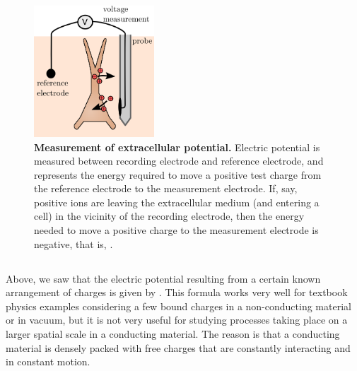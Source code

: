 \begin{figure}[!ht]
\begin{center}
\includegraphics[width=0.4\textwidth]{Figures/Basics/rec_elec_circuit.png}
\end{center}
\caption[]{\textbf{Measurement of extracellular potential.}
Electric potential is measured between recording electrode and reference electrode, and represents the energy required to move a positive test charge from the reference electrode to the measurement electrode. If, say, positive ions are leaving the extracellular medium (and entering a cell) in the vicinity of the recording electrode, then the energy needed to move a positive charge to the measurement electrode is negative, that is, .}
\label{fig:Basics:elec_circuit}
\end{figure}


\subsection{}
\label{sec:Basics:Debye}
Above, we saw that the electric potential resulting from a certain known arrangement of charges is given by . This formula works very well for textbook physics examples considering a few bound charges in a non-conducting material or in vacuum, but it is not very useful for studying processes taking place on a larger spatial scale in a conducting material. The reason is that a conducting material is densely packed with free charges that are constantly interacting and in constant motion. 

